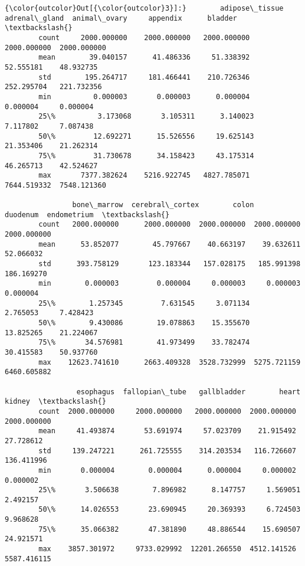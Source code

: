 \documentclass[11pt]{article}
\begin{document}
\begin{Verbatim}[commandchars=\\\{\}]
{\color{outcolor}Out[{\color{outcolor}3}]:}        adipose\_tissue  adrenal\_gland  animal\_ovary     appendix      bladder  \textbackslash{}
        count     2000.000000    2000.000000   2000.000000  2000.000000  2000.000000   
        mean        39.040157      41.486336     51.338392    52.555181    48.932735   
        std        195.264717     181.466441    210.726346   252.295704   221.732356   
        min          0.000003       0.000003      0.000004     0.000004     0.000004   
        25\%          3.173068       3.105311      3.140023     7.117802     7.087438   
        50\%         12.692271      15.526556     19.625143    21.353406    21.262314   
        75\%         31.730678      34.158423     43.175314    46.265713    42.524627   
        max       7377.382624    5216.922745   4827.785071  7644.519332  7548.121360   
        
                bone\_marrow  cerebral\_cortex        colon     duodenum  endometrium  \textbackslash{}
        count   2000.000000      2000.000000  2000.000000  2000.000000  2000.000000   
        mean      53.852077        45.797667    40.663197    39.632611    52.066032   
        std      393.758129       123.183344   157.028175   185.991398   186.169270   
        min        0.000003         0.000004     0.000003     0.000003     0.000004   
        25\%        1.257345         7.631545     3.071134     2.765053     7.428423   
        50\%        9.430086        19.078863    15.355670    13.825265    21.224067   
        75\%       34.576981        41.973499    33.782474    30.415583    50.937760   
        max    12623.741610      2663.409328  3528.732999  5275.721159  6460.605882   
        
                 esophagus  fallopian\_tube   gallbladder        heart       kidney  \textbackslash{}
        count  2000.000000     2000.000000   2000.000000  2000.000000  2000.000000   
        mean     41.493874       53.691974     57.023709    21.915492    27.728612   
        std     139.247221      261.725555    314.203534   116.726607   136.411996   
        min       0.000004        0.000004      0.000004     0.000002     0.000002   
        25\%       3.506638        7.896982      8.147757     1.569051     2.492157   
        50\%      14.026553       23.690945     20.369393     6.724503     9.968628   
        75\%      35.066382       47.381890     48.886544    15.690507    24.921571   
        max    3857.301972     9733.029992  12201.266550  4512.141526  5587.416115   
        

\end{Verbatim}
\end{document}
